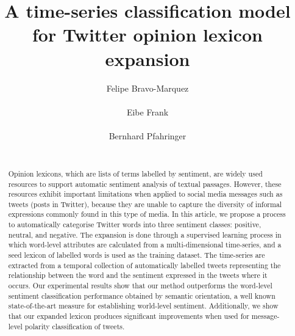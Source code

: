 \documentclass{sig-alternate}
\begin{document}
 


\title{ A time-series classification model for Twitter opinion lexicon expansion}

\author{
%
%
\alignauthor
Felipe Bravo-Marquez\\
	\\
\alignauthor Eibe Frank\\
       \\
\alignauthor Bernhard Pfahringer\\
       \\
}



\maketitle

\begin{abstract}
Opinion lexicons, which are lists of terms labelled by sentiment, are widely used resources to support automatic sentiment analysis of textual passages. However, these resources exhibit important limitations when applied to social media messages such as tweets (posts in Twitter), because they are unable to capture the diversity of informal expressions commonly found in this type of media. In this article, we propose a process to automatically categorise Twitter words into three sentiment classes: positive, neutral, and negative. The expansion is done through a supervised learning process in which word-level attributes are calculated from a multi-dimensional time-series, and a seed lexicon of labelled words is used as the training dataset. The time-series are extracted from a temporal collection of automatically labelled tweets representing the relationship between the word and the sentiment expressed in the tweets where it occurs. Our experimental results show that our method outperforms the word-level sentiment classification performance obtained by semantic orientation, a well known state-of-the-art measure for establishing world-level sentiment. Additionally, we show that our expanded lexicon produces significant improvements when used for message-level polarity classification of tweets.


\end{abstract}
\end{document}
